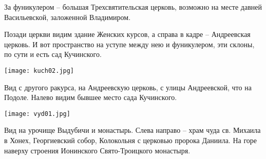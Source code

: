 \documentclass[a5paper,11pt,openany]{article}
\begin{document}
За фуникулером – большая Трехсвятительская церковь, возможно на месте давней Васильевской, заложенной Владимиром.

Позади церкви видим здание Женских курсов, а справа в кадре – Андреевская церковь. И вот пространство на уступе между нею и фуникулером, эти склоны, по сути и есть сад Кучинского.

\vspace*{\fill}

\newpage

\vspace*{\fill}

\begin{center}
\texttt{[image: kuch02.jpg]}
\end{center}

Вид с другого ракурса, на Андреевскую церковь, с улицы Андреевской, что на Подоле. Налево видим бывшее место сада Кучинского.

\vspace*{\fill}

\newpage

\vspace*{\fill}


\begin{center}
\texttt{[image: vyd01.jpg]}
\end{center}

Вид на урочище Выдубичи и монастырь. Слева направо – храм чуда св. Михаила в Хонех, Георгиевский собор, Колокольня с церковью пророка Даниила. На горе наверху строения Ионинского Свято-Троицкого монастыря.

\vspace*{\fill}


\newpage




%

\begin{thebibliography}{999}

\end{thebibliography}
\end{document}
